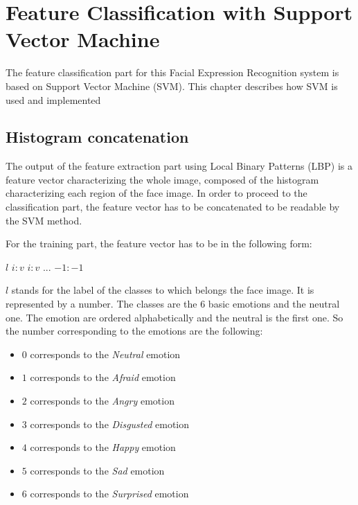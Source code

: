 \chapter{Feature Classification with Support Vector Machine}
\label{chap:implementation_svm}

\noindent The feature classification part for this Facial Expression Recognition system is based on Support Vector Machine (SVM). This chapter describes how SVM is used and implemented
\newline

\section{Histogram concatenation}

\vspace{\baselineskip}
\noindent The output of the feature extraction part using Local Binary Patterns (LBP) is a feature vector characterizing the whole image, composed of the histogram characterizing each region of the face image. In order to proceed to the classification part, the feature vector has to be concatenated to be readable by the SVM method.
\newline

\noindent For the training part, the feature vector has to be in the following form:
\begin{center}
\noindent $ l $ \hspace{0.7cm} $ i:v $ \hspace{0.2cm} $ i:v $ \hspace{0.2cm} $ ... $ \hspace{0.2cm} $ -1:-1 $
\end{center} 
\noindent $ l $ stands for the label of the classes to which belongs the face image. It is represented by a number. The classes are the 6 basic emotions and the neutral one. The emotion are ordered alphabetically and the neutral is the first one. So the number corresponding to the emotions are the following:

\begin{itemize}
  \item $ 0 $ corresponds to the \textit{Neutral} emotion
  \item $ 1 $ corresponds to the \textit{Afraid} emotion
  \item $ 2 $ corresponds to the \textit{Angry} emotion
  \item $ 3 $ corresponds to the \textit{Disgusted} emotion
  \item $ 4 $ corresponds to the \textit{Happy} emotion
  \item $ 5 $ corresponds to the \textit{Sad} emotion
  \item $ 6 $ corresponds to the \textit{Surprised} emotion
\end{itemize}

